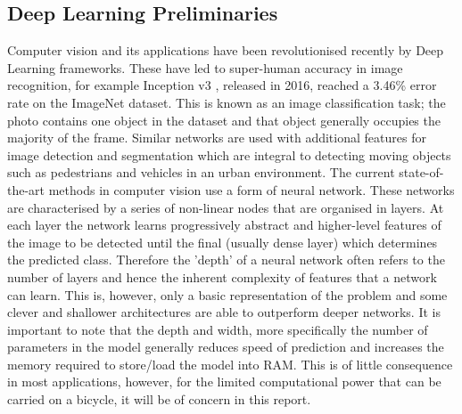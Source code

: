 \documentclass[11pt,twoside]{report}
\begin{document}
\subsection{Deep Learning Preliminaries} \label{dlp}
Computer vision and its applications have been revolutionised recently by Deep Learning frameworks. These have led to super-human accuracy in image recognition, for example Inception v3 \cite{Szegedy_2016_CVPR}, released in 2016, reached a 3.46\% error rate on the ImageNet \cite{ILSVRC15} dataset. This is known as an image classification task; the photo contains one object in the dataset and that object generally occupies the majority of the frame. Similar networks are used with additional features for image detection and segmentation which are integral to detecting moving objects such as pedestrians and vehicles in an urban environment.
\newline\newline
The current state-of-the-art methods in computer vision use a form of neural network. These networks are characterised by a series of non-linear nodes that are organised in layers. At each layer the network learns progressively abstract and higher-level features of the image to be detected until the final (usually dense layer) which determines the predicted class. Therefore the 'depth' of a neural network often refers to the number of layers and hence the inherent complexity of features that a network can learn. This is, however, only a basic representation of the problem and some clever and shallower architectures are able to outperform deeper networks. It is important to note that the depth and width, more specifically the number of parameters in the model generally reduces speed of prediction and increases the memory required to store/load the model into RAM. This is of little consequence in most applications, however, for the limited computational power that can be carried on a bicycle, it will be of concern in this report.
\end{document}
